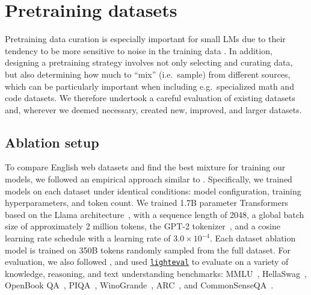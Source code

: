 \documentclass{article}
\theoremstyle{plain}
\theoremstyle{definition}
\theoremstyle{remark}
\begin{document}
\section{Pretraining datasets}
\label{sec:datasets}
Pretraining data curation is especially important for small LMs due to their tendency to be more sensitive to noise in the training data \cite{rolnick1705deep,abdin2024phi3}.
In addition, designing a pretraining strategy involves not only selecting and curating data, but also determining how much to ``mix'' (i.e.\ sample) from different sources, which can be particularly important when including e.g.\ specialized math and code datasets.
We therefore undertook a careful evaluation of existing datasets and, wherever we deemed necessary, created new, improved, and larger datasets.

\subsection{Ablation setup}
\label{sec:ablation_setup}
To compare English web datasets and find the best mixture for training our models, we followed an empirical approach similar to \citet{Penedo2024TheFD}. Specifically, we trained models on each dataset under identical conditions: model configuration, training hyperparameters, and token count. We trained 1.7B parameter Transformers \citep{NIPS2017_3f5ee243} based on the Llama architecture~\cite{touvron2023llama}, with a sequence length of 2048, a global batch size of approximately 2 million tokens, the GPT-2 tokenizer~\cite{radford2019language}, and a cosine learning rate schedule \citep{loshchilov2016sgdr} with a learning rate of $3.0 \times 10^{-4}$.
Each dataset ablation model is trained on 350B tokens randomly sampled from the full dataset.
For evaluation, we also followed \citet{Penedo2024TheFD}, and used \href{https://github.com/huggingface/lighteval/}{\texttt{lighteval}} to evaluate on a variety of knowledge, reasoning, and text understanding benchmarks: MMLU~\cite{hendrycks2021measuring}, HellaSwag~\cite{zellers-etal-2019-hellaswag}, OpenBook QA~\cite{OpenBookQA2018}, PIQA~\cite{bisk2019piqa}, WinoGrande~\cite{sakaguchi2019winogrande}, ARC~\cite{clark2018think}, and CommonSenseQA~\cite{talmor-etal-2019-commonsenseqa}.
\end{document}
